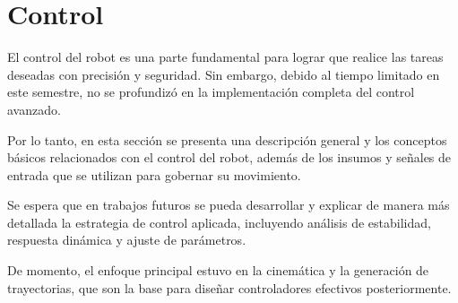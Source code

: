 \section{Control} \label{sec:control}

El control del robot es una parte fundamental para lograr que realice las tareas deseadas con precisión y seguridad. Sin embargo, debido al tiempo limitado en este semestre, no se profundizó en la implementación completa del control avanzado.

Por lo tanto, en esta sección se presenta una descripción general y los conceptos básicos relacionados con el control del robot, además de los insumos y señales de entrada que se utilizan para gobernar su movimiento.

Se espera que en trabajos futuros se pueda desarrollar y explicar de manera más detallada la estrategia de control aplicada, incluyendo análisis de estabilidad, respuesta dinámica y ajuste de parámetros.

De momento, el enfoque principal estuvo en la cinemática y la generación de trayectorias, que son la base para diseñar controladores efectivos posteriormente.
